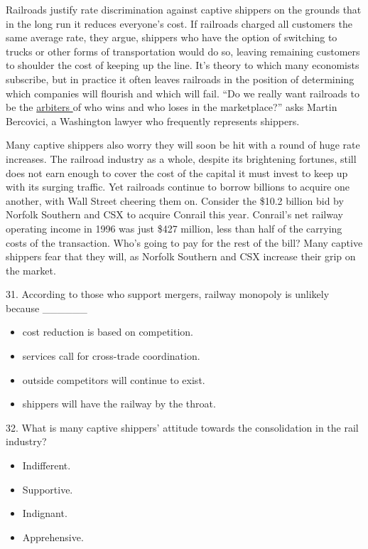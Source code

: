 \documentclass[UTF8,11pt]{ctexart}
\begin{document}
Railroads justify rate discrimination against captive shippers on the grounds that in the long run it reduces everyone’s cost. If railroads charged all customers the same average rate, they argue, shippers who have the option of switching to trucks or other forms of transportation would do so, leaving remaining customers to shoulder the cost of keeping up the line. It’s theory to which many economists subscribe, but in practice it often leaves railroads in the position of determining which companies will flourish and which will fail. “Do we really want railroads to be the \uline{arbiters }of who wins and who loses in the marketplace?” asks Martin Bercovici, a Washington lawyer who frequently represents shippers.


Many captive shippers also worry they will soon be hit with a round of huge rate increases. The railroad industry as a whole, despite its brightening fortunes, still does not earn enough to cover the cost of the capital it must invest to keep up with its surging traffic. Yet railroads continue to borrow billions to acquire one another, with Wall Street cheering them on. Consider the \$10.2 billion bid by Norfolk Southern and CSX to acquire Conrail this year. Conrail’s net railway operating income in 1996 was just \$427 million, less than half of the carrying costs of the transaction. Who’s going to pay for the rest of the bill? Many captive shippers fear that they will, as Norfolk Southern and CSX increase their grip on the market.


31. According to those who support mergers, railway monopoly is unlikely because \_\_\_\_\_\_


\begin{itemize}[leftmargin=2em,itemsep=.2em,topsep=.4em]\item[A.] cost reduction is based on competition.
\item[B.] services call for cross-trade coordination.
\item[C.] outside competitors will continue to exist.
\item[D.] shippers will have the railway by the throat.
\end{itemize}

32. What is many captive shippers’ attitude towards the consolidation in the rail industry?


\begin{itemize}[leftmargin=2em,itemsep=.2em,topsep=.4em]\item[A.] Indifferent.
\item[B.] Supportive.
\item[C.] Indignant.
\item[D.] Apprehensive.
\end{itemize}
\end{document}
